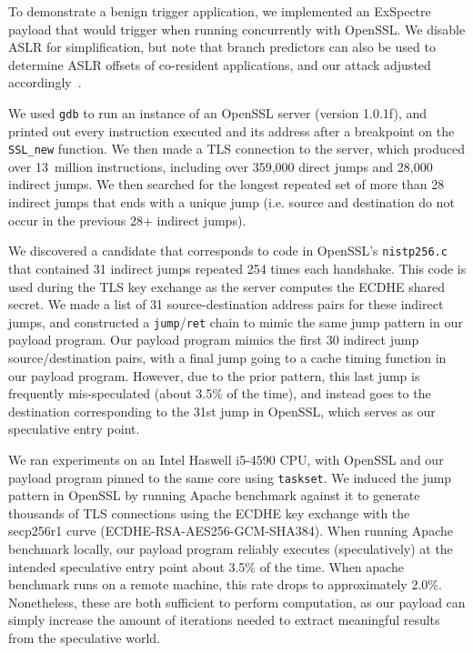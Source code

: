 To demonstrate a benign trigger application, we implemented an ExSpectre payload
that would trigger when running concurrently with OpenSSL.
We disable ASLR for simplification, but note that branch predictors can also be
used to determine ASLR offsets of co-resident applications, and our attack
adjusted accordingly~\cite{evtyushkin2016jump}.

We used \texttt{gdb} to run an instance of an OpenSSL server (version 1.0.1f),
and printed out every instruction executed and its address after a breakpoint on
the \texttt{SSL\_new} function. We then made a TLS connection to the server,
which produced over 13~million instructions, including over 359,000 direct jumps
and 28,000 indirect jumps. We then searched for the longest repeated set of more
than 28 indirect jumps that ends with a unique jump (i.e. source and destination
do not occur in the previous 28+ indirect jumps).

We discovered a candidate that corresponds to code in OpenSSL's
\texttt{nistp256.c} that contained 31 indirect jumps repeated 254 times each
handshake. This code is used during the TLS key exchange as the server computes
the ECDHE shared secret. We made a list of 31 source-destination address pairs
for these indirect jumps, and constructed a \texttt{jump}/\texttt{ret} chain to
mimic the same jump pattern in our payload program. Our payload program mimics
the first 30 indirect jump source/destination pairs, with a final jump going to
a cache timing function in our payload program. However, due to the prior
pattern, this last jump is frequently mis-speculated (about 3.5\% of the time),
and instead goes to the destination corresponding to the 31st jump in OpenSSL,
which serves as our speculative entry point.


We ran experiments on an Intel Haswell i5-4590 CPU, with OpenSSL and our payload
program pinned to the same core using \texttt{taskset}. We induced the jump
pattern in OpenSSL by running Apache benchmark against it to generate thousands
of TLS connections using the ECDHE key exchange with the secp256r1 curve
(ECDHE-RSA-AES256-GCM-SHA384). When running Apache benchmark locally, our
payload program reliably executes (speculatively) at the intended speculative
entry point about 3.5\% of the time. When apache benchmark runs on a remote
machine, this rate drops to approximately 2.0\%. Nonetheless, these are both
sufficient to perform computation, as our payload can simply increase the amount
of iterations needed to extract meaningful results from the speculative world.


